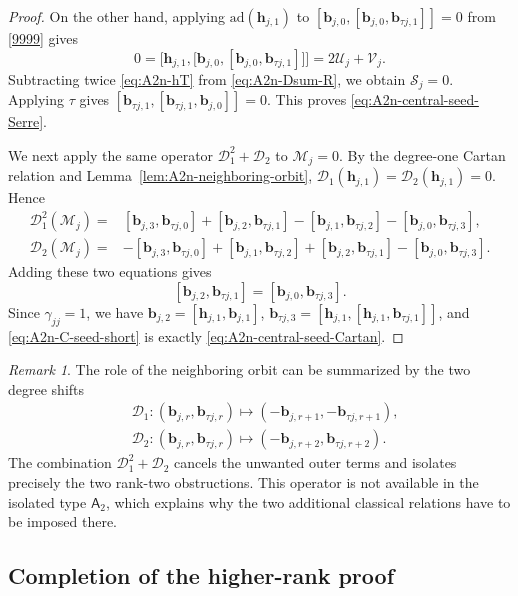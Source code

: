 \documentclass[11pt,reqno]{amsart}
\numberwithin{equation}{section}
\theoremstyle{definition}
\theoremstyle{remark}
\newtheorem{rem}[thm]{Remark}
\newcommand{\cD}{\mathcal{D}}
\newcommand{\bb}{\mathbf{b}}
\newcommand{\bh}{\mathbf{h}}
\newcommand{\ad}{\mathrm{ad}}
\begin{document}
\begin{proof}
On the other hand, applying $\ad(\bh_{j,1})$ to
$[\bb_{j,0},[\bb_{j,0},\bb_{\tau j,1}]]=0$ from \eqref{9999} gives
\begin{equation}\label{eq:A2n-hT}
0
=
\Big[\bh_{j,1},\big[\bb_{j,0},[\bb_{j,0},\bb_{\tau j,1}]\big]\Big]
=
2\mathcal U_j+\mathcal V_j.
\end{equation}
Subtracting twice \eqref{eq:A2n-hT} from
\eqref{eq:A2n-Dsum-R}, we obtain $\mathcal S_j=0$. Applying $\tau$ gives $[\bb_{\tau j,1},[\bb_{\tau j,1},\bb_{j,0}]]=0$. This proves \eqref{eq:A2n-central-seed-Serre}.

We next apply the same operator $\cD_1^2+\cD_2$ to
$\mathcal M_j=0$.  By the degree-one Cartan relation and
Lemma~\ref{lem:A2n-neighboring-orbit}, $\cD_1(\bh_{j,1})=\cD_2(\bh_{j,1})=0$. Hence
\begin{align*}
\cD_1^2(\mathcal M_j)
={}&
[\bb_{j,3},\bb_{\tau j,0}]
+
[\bb_{j,2},\bb_{\tau j,1}]
-
[\bb_{j,1},\bb_{\tau j,2}]
-
[\bb_{j,0},\bb_{\tau j,3}],
\\
\cD_2(\mathcal M_j)
={}&
-[\bb_{j,3},\bb_{\tau j,0}]
+
[\bb_{j,1},\bb_{\tau j,2}]
+
[\bb_{j,2},\bb_{\tau j,1}]
-
[\bb_{j,0},\bb_{\tau j,3}].
\end{align*}
Adding these two equations gives
\begin{equation}\label{eq:A2n-C-seed-short}
[\bb_{j,2},\bb_{\tau j,1}]
=
[\bb_{j,0},\bb_{\tau j,3}].
\end{equation}
Since $\gamma_{jj}=1$, we have $\bb_{j,2}
=
[\bh_{j,1},\bb_{j,1}]$, $\bb_{\tau j,3}
=
[\bh_{j,1},
[\bh_{j,1},\bb_{\tau j,1}]]$,
and \eqref{eq:A2n-C-seed-short} is exactly
\eqref{eq:A2n-central-seed-Cartan}.
\end{proof}

\begin{rem}\label{rem:A2n-D-idea}
The role of the neighboring orbit can be summarized by the two
degree shifts
\begin{align*}
&\cD_1:
(\bb_{j,r},\bb_{\tau j,r})
\longmapsto
(-\bb_{j,r+1},-\bb_{\tau j,r+1}),\\
&\cD_2:
(\bb_{j,r},\bb_{\tau j,r})
\longmapsto
(-\bb_{j,r+2},\bb_{\tau j,r+2}).
\end{align*}
The combination $\cD_1^2+\cD_2$ cancels the unwanted outer terms and
isolates precisely the two rank-two obstructions.  This operator is
not available in the isolated type $\mathsf A_2$, which explains
why the two additional classical relations have to be imposed there.
\end{rem}

\subsection{Completion of the higher-rank proof}
\end{document}
